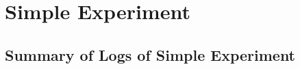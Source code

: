 \documentclass[12pt,a4paper,twoside,openright]{report}
\begin{document}
		
		
		
		
		
		
		
		




\chapter{Simple Experiment}

\section{Summary of Logs of Simple Experiment}
\label{appendix:simplelogsummary}
\end{document}
